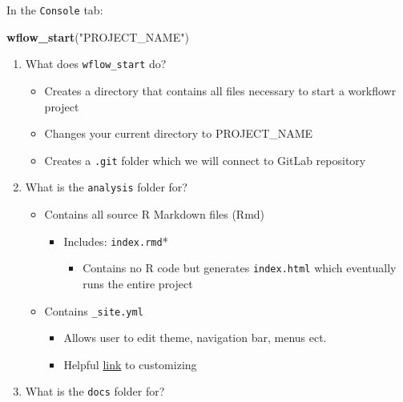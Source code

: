 \documentclass[openany]{article}
\newenvironment{Shaded}{\begin{snugshade}}{\end{snugshade}}
\newcommand{\KeywordTok}[1]{\textcolor[rgb]{0.13,0.29,0.53}{\textbf{#1}}}
\newcommand{\NormalTok}[1]{#1}
\newcommand{\StringTok}[1]{\textcolor[rgb]{0.31,0.60,0.02}{#1}}
\providecommand{\tightlist}{%
  \setlength{\itemsep}{0pt}\setlength{\parskip}{0pt}}
\begin{document}
In the \texttt{Console} tab:

\begin{Shaded}
\begin{Highlighting}[]
\KeywordTok{wflow_start}\NormalTok{(}\StringTok{"PROJECT_NAME"}\NormalTok{)}
\end{Highlighting}
\end{Shaded}

\begin{enumerate}
\def\labelenumi{\arabic{enumi}.}
\tightlist
\item
  What does \texttt{wflow\_start} do?

  \begin{itemize}
  \tightlist
  \item
    Creates a directory that contains all files necessary to start a workflowr project
  \item
    Changes your current directory to PROJECT\_NAME
  \item
    Creates a \texttt{.git} folder which we will connect to GitLab repository
  \end{itemize}
\item
  What is the \texttt{analysis} folder for?

  \begin{itemize}
  \tightlist
  \item
    Contains all source R Markdown files (Rmd)

    \begin{itemize}
    \tightlist
    \item
      Includes: \texttt{index.rmd}*

      \begin{itemize}
      \tightlist
      \item
        Contains no R code but generates \texttt{index.html} which eventually runs the entire project
      \end{itemize}
    \end{itemize}
  \item
    Contains \texttt{\_site.yml}

    \begin{itemize}
    \tightlist
    \item
      Allows user to edit theme, navigation bar, menus ect.
    \item
      Helpful \href{https://bookdown.org/yihui/rmarkdown/rmarkdown-site.html}{link} to customizing
    \end{itemize}
  \end{itemize}
\item
  What is the \texttt{docs} folder for?


\end{enumerate}
\end{document}
